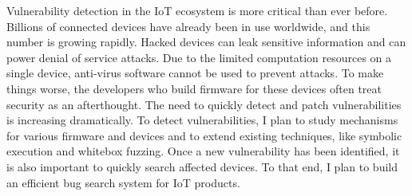 \documentclass[10pt]{article}
\begin{document}
Vulnerability detection in the IoT ecosystem is more critical than ever before.
Billions of connected devices have already been in use worldwide, 
and this number is growing rapidly.  
Hacked devices can leak sensitive information and can power denial of service attacks. 
Due to the limited computation resources on a single device, 
anti-virus software cannot be used to prevent attacks. 
To make things worse, the developers who build firmware for these devices often treat security as an afterthought. 
The need to quickly detect and patch vulnerabilities is increasing dramatically. 
To detect vulnerabilities, I plan to study mechanisms for various firmware and devices 
and to extend existing techniques, like symbolic execution and whitebox fuzzing. 
Once a new vulnerability has been identified, it is also important to quickly search affected devices. 
To that end, I plan to build an efficient bug search system for IoT products.  


\newpage


\end{document}

